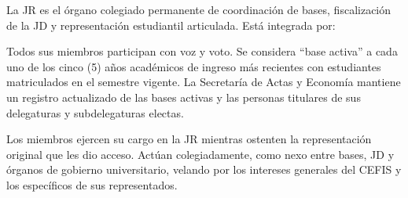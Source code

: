 \documentclass[11pt]{article}
\begin{document}
\begin{artitems}
\end{artitems}


La JR es el órgano colegiado permanente de coordinación de bases, fiscalización de la JD y representación estudiantil articulada. Está integrada por:
\begin{artitems}
\end{artitems}
Todos sus miembros participan con voz y voto. Se considera ``base activa'' a cada uno de los cinco (5) años académicos de ingreso más recientes con estudiantes matriculados en el semestre vigente. La Secretaría de Actas y Economía mantiene un registro actualizado de las bases activas y las personas titulares de sus delegaturas y subdelegaturas electas.

Los miembros ejercen su cargo en la JR mientras ostenten la representación original que les dio acceso. Actúan colegiadamente, como nexo entre bases, JD y órganos de gobierno universitario, velando por los intereses generales del CEFIS y los específicos de sus representados.
\end{document}
